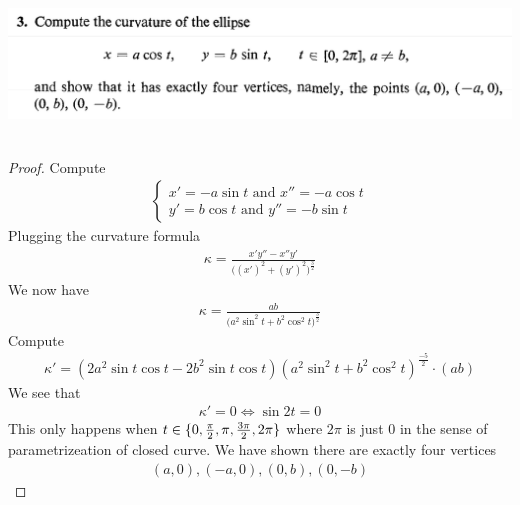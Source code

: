 \documentclass{report}
\begin{document}
\begin{question}{}{}
\includegraphics[height=4cm,width=18cm]{hw2q15}
\end{question}
\begin{proof}
Compute 
\begin{align*}
\begin{cases}
  x'=-a \sin t \text{ and }x''=-a\cos t\\
  y'=b \cos t \text{ and } y''=-b \sin t
\end{cases}
\end{align*}
Plugging the curvature formula 
\begin{align*}
\kappa =\frac{x'y''-x''y'}{\big((x')^2 +(y')^2 \big)^{\frac{3}{2}}}
\end{align*}
We now have 
\begin{align*}
\kappa = \frac{ab }{\big(a^2 \sin ^2 t + b^2 \cos ^2 t \big)^{\frac{3}{2}}}
\end{align*}
Compute 
\begin{align*}
\kappa' = (2a^2 \sin t \cos t -2b^2 \sin t \cos t)(a^2\sin ^2 t + b^2 \cos ^2 t)^{\frac{-5}{2}}\cdot (ab)
\end{align*}
We see that 
\begin{align*}
\kappa'=0 \iff  \sin 2t =0
\end{align*}
This only happens when $t \in \{ 0,\frac{\pi}{2},\pi,\frac{3\pi}{2},2\pi \}$ where $2 \pi$ is just $0$ in the sense of parametrizeation of closed curve. We have shown there are exactly four vertices 
 \begin{align*}
   (a,0),(-a,0),(0,b),(0,-b)
\end{align*}
\end{proof}
\end{document}
